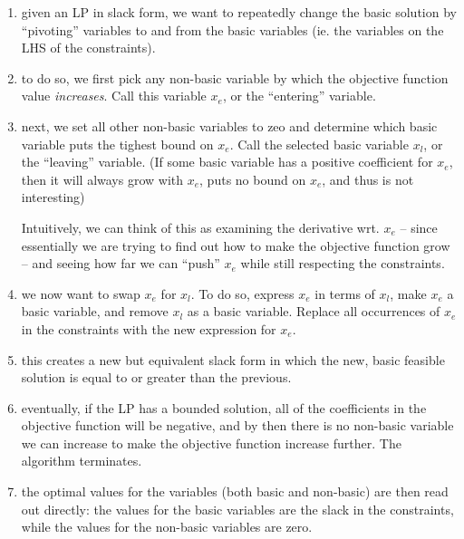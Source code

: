 \begin{enumerate}

  \item given an LP in slack form, we want to repeatedly change the basic
    solution by ``pivoting'' variables to and from the basic variables (ie. the
    variables on the LHS of the constraints).

  \item to do so, we first pick any non-basic variable by which the objective
    function value \emph{increases}. Call this variable $x_e$, or the
    ``entering'' variable.

  \item next, we set all other non-basic variables to zeo and determine which
    basic variable puts the tighest bound on $x_e$. Call the selected basic
    variable $x_l$, or the ``leaving'' variable. (If some basic variable has a
    positive coefficient for $x_e$, then it will always grow with $x_e$, puts no
    bound on $x_e$, and thus is not interesting)

    Intuitively, we can think of this as examining the derivative wrt. $x_e$ --
    since essentially we are trying to find out how to make the objective
    function grow -- and seeing how far we can ``push'' $x_e$ while still
    respecting the constraints.

  \item we now want to swap $x_e$ for $x_l$. To do so, express $x_e$ in terms of
    $x_l$, make $x_e$ a basic variable, and remove $x_l$ as a basic variable.
    Replace all occurrences of $x_e$ in the constraints with the new expression
    for $x_e$.

  \item this creates a new but equivalent slack form in which the new, basic
    feasible solution is equal to or greater than the previous.

  \item eventually, if the LP has a bounded solution, all of the coefficients in
    the objective function will be negative, and by then there is no non-basic
    variable we can increase to make the objective function increase further.
    The algorithm terminates.

  \item the optimal values for the variables (both basic and non-basic) are then
    read out directly: the values for the basic variables are the slack in the
    constraints, while the values for the non-basic variables are zero.
\end{enumerate}


